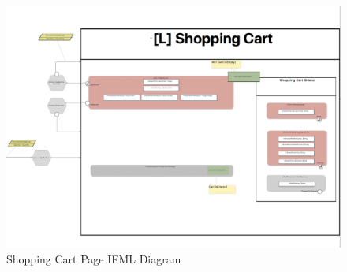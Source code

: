 \begin{figure}[H]
  \centering
    \includegraphics[width=14cm]{images/diagrams/before/ifml-shoppingcart.png}
  \caption{Shopping Cart Page IFML Diagram}
  \label{fig:ifml-before-shoppingcart}
\end{figure}

